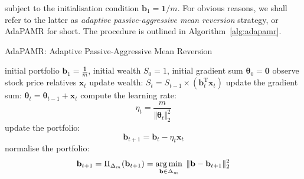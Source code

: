 subject to the initialisation condition $\mathbf{b}_1 = \mathbf{1} / m$.
For obvious reasons, we shall refer to the latter as \emph{adaptive passive-aggressive mean reversion} strategy, or AdaPAMR for short. The procedure is outlined in Algorithm~\ref{alg:adapamr}.
\begin{algorithm}
  \caption{AdaPAMR: Adaptive Passive-Aggressive Mean Reversion}
\label{alg:adapamr}
  \begin{algorithmic}[1]
     initial portfolio $\mathbf{b}_1 = \frac{\mathbf{1}}{m}$, initial wealth $S_0 = 1$, initial gradient sum $\boldsymbol{\theta}_0 = \mathbf{0}$
      \STATE observe stock price relatives $\mathbf{x}_t$
      \STATE update wealth:
        $
          S_t = S_{t-1} \times (\mathbf{b}_t^\text{T}\mathbf{x}_t)
        $
        \STATE update the gradient sum: $\boldsymbol{\theta}_t = \boldsymbol{\theta}_{t-1} + \mathbf{x}_t$
        \STATE compute the learning rate:
        \begin{equation*}
        	\eta_t = \frac{m}{\Vert\boldsymbol{\theta}_{t}\Vert^2_2}
        \end{equation*}
        \STATE update the portfolio:
	\begin{equation*}
		\mathbf{b}_{t+1} = 	\mathbf{b}_{t} - \eta_t\mathbf{x}_t
	\end{equation*}
		\STATE normalise the portfolio:
		\begin{equation*}
			\mathbf{b}_{t+1} = \Pi_{\Delta_m}(\mathbf{b}_{t+1})
			= \operatorname*{arg\,min}_{\mathbf{b}\in\Delta_m} \; \Vert\mathbf{b} - \mathbf{b}_{t+1}\Vert_2^2
		\end{equation*}
	\ENDIF
    \ENDFOR
  \end{algorithmic}
\end{algorithm}

